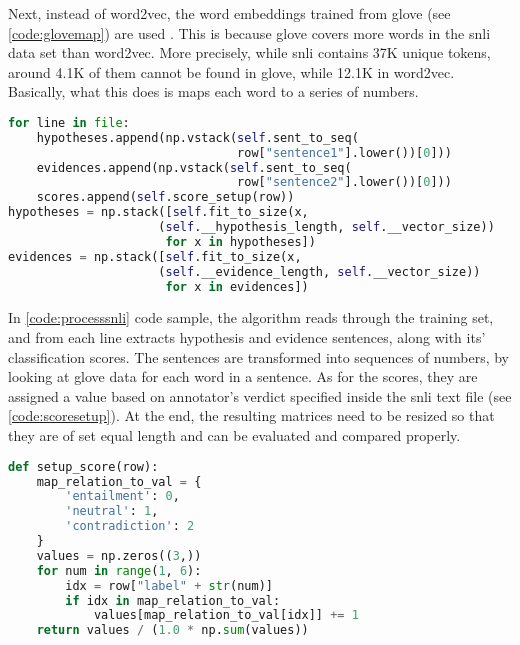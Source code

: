            Next, instead of word2vec, the word embeddings trained from \gls{glove} (see \cref{code:glovemap}) are used \autocite{Pennington2014GloveGV}. This is because \gls{glove} covers more words in the \gls{snli} data set than word2vec. More precisely, while \gls{snli} contains 37K unique tokens, around 4.1K of them cannot be found in \gls{glove}, while 12.1K in word2vec. Basically, what this does is maps each word to a series of numbers.
            
            \begin{lstlisting}[language=Python, caption=Processing SNLI Data Set, label=code:processsnli]
for line in file:
    hypotheses.append(np.vstack(self.sent_to_seq(
                                row["sentence1"].lower())[0]))
    evidences.append(np.vstack(self.sent_to_seq(
                                row["sentence2"].lower())[0]))
    scores.append(self.score_setup(row))
hypotheses = np.stack([self.fit_to_size(x, 
                     (self.__hypothesis_length, self.__vector_size))
                      for x in hypotheses])
evidences = np.stack([self.fit_to_size(x, 
                     (self.__evidence_length, self.__vector_size))
                      for x in evidences])
            \end{lstlisting}
            
            In \cref{code:processsnli} code sample, the algorithm reads through the training set, and from each line extracts hypothesis and evidence sentences, along with its' classification scores. The sentences are transformed into sequences of numbers, by looking at \gls{glove} data for each word in a sentence. As for the scores, they are assigned a value based on annotator's verdict specified inside the \gls{snli} text file (see \cref{code:scoresetup}). At the end, the resulting matrices need to be resized so that they are of set equal length and can be evaluated and compared properly.
            
            \begin{lstlisting}[language=Python, caption=Classification Score Setup, label=code:scoresetup]
def setup_score(row):
    map_relation_to_val = {
        'entailment': 0,
        'neutral': 1,
        'contradiction': 2
    }
    values = np.zeros((3,))
    for num in range(1, 6):
        idx = row["label" + str(num)]
        if idx in map_relation_to_val:
            values[map_relation_to_val[idx]] += 1
    return values / (1.0 * np.sum(values))
            \end{lstlisting}
            
